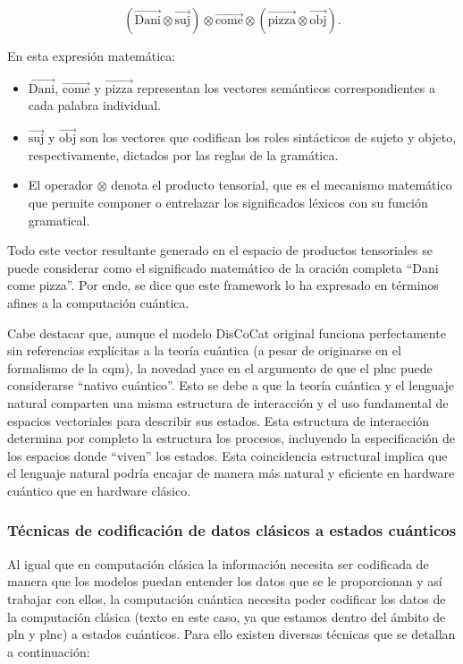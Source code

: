 \[
    (\overrightarrow{\text{Dani}} \otimes \overrightarrow{\text{suj}}) \otimes \overrightarrow{\text{come}} \otimes (\overrightarrow{\text{pizza}} \otimes \overrightarrow{\text{obj}}).
\]

En esta expresión matemática:
\begin{itemize}
    \item $\overrightarrow{\text{Dani}}$, $\overrightarrow{\text{come}}$ y $\overrightarrow{\text{pizza}}$ representan los vectores semánticos correspondientes a cada palabra individual.
    \item $\overrightarrow{\text{suj}}$ y $\overrightarrow{\text{obj}}$ son los vectores que codifican los roles sintácticos de sujeto y objeto, respectivamente, dictados por las reglas de la gramática.
    \item El operador $\otimes$ denota el producto tensorial, que es el mecanismo matemático que permite componer o entrelazar los significados léxicos con su función gramatical.
\end{itemize}

Todo este vector resultante generado en el espacio de productos tensoriales se puede considerar como el significado matemático de la oración completa ``Dani come pizza''. Por ende, se dice que este framework lo ha expresado en términos afines a la computación cuántica.

Cabe destacar que, aunque el modelo DisCoCat original funciona perfectamente sin referencias explícitas a la teoría cuántica (a pesar de originarse en el formalismo de la \gls{cqm}), la novedad yace en el argumento de que el \gls{plnc} puede considerarse ``nativo cuántico''. Esto se debe a que la teoría cuántica y el lenguaje natural comparten una misma estructura de interacción y el uso fundamental de espacios vectoriales para describir sus estados. Esta estructura de interacción determina por completo la estructura los procesos, incluyendo la especificación de los espacios donde ``viven'' los estados. Esta coincidencia estructural implica que el lenguaje natural podría encajar de manera más natural y eficiente en hardware cuántico que en hardware clásico.

\subsubsection{Técnicas de codificación de datos clásicos a estados cuánticos}

Al igual que en computación clásica la información necesita ser codificada de manera que los modelos puedan entender los datos que se le proporcionan y así trabajar con ellos, la computación cuántica necesita poder codificar los datos de la computación clásica (texto en este caso, ya que estamos dentro del ámbito de \gls{pln} y \gls{plnc}) a estados cuánticos. Para ello existen diversas técnicas que se detallan a continuación:

